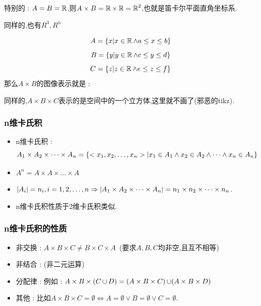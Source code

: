 {{{  特别的 : $A = B = \operatorname{\mathbb{R}}$,则$A \times B = \operatorname{\mathbb{R}} \times \operatorname{\mathbb{R}} = \operatorname{\mathbb{R}}^2$,也就是笛卡尔平面直角坐标系.

  同样的,也有$R^3,R^n$


  $$
    A = \{x | x \in \operatorname{\mathbb{R}} \land a \leq x \leq b\}
  $$
  $$
    B = \{y | y \in \operatorname{\mathbb{R}} \land c \leq y \leq d\}
  $$
  $$
    C = \{z | z \in \operatorname{\mathbb{R}} \land e \leq z \leq f\}
  $$
  那么$A \times B$的图像表示就是 :
  \begin{center}
  \end{center}

  同样的,$A \times B \times C$表示的是空间中的一个立方体,这里就不画了(邪恶的tikz).
}%

\subsubsection{n维卡氏积}{
  \begin{itemize}
    \item n维卡氏积 : $$
            A_1 \times A_2 \times \dots \times A_n = \left\{ <x_1,x_2,\dots,x_n> | x_1 \in A_1 \land x_2 \in A_2 \land \dots \land x_n \in A_n \right\}
          $$
    \item $A^n = A \times A \times \dots \times A$
    \item $\left\lvert A_i \right\vert = n_i,i = 1,2,\dots,n \Rightarrow \left\lvert A_1 \times A_2 \times \dots \times A_n \right\vert = n_1 \times n_2 \times \dots \times n_n$.
    \item n维卡氏积性质于2维卡氏积类似.
  \end{itemize}
}%

\subsubsection{n维卡氏积的性质}{
  \begin{itemize}
    \item 非交换 : $A \times B \times C \neq B \times C \times A$\ (要求$A,B,C$均非空,且互不相等)
    \item 非结合 : (非二元运算)
    \item 分配律 : 例如 : $A \times B \times (C \operatorname{\cup} D) = (A \times B \times C) \operatorname{\cup} (A \times B \times D)$
    \item 其他 : 比如$A \times B \times C = \emptyset \Leftrightarrow A = \emptyset \lor B = \emptyset \lor C = \emptyset$.
  \end{itemize}
}%

}}
